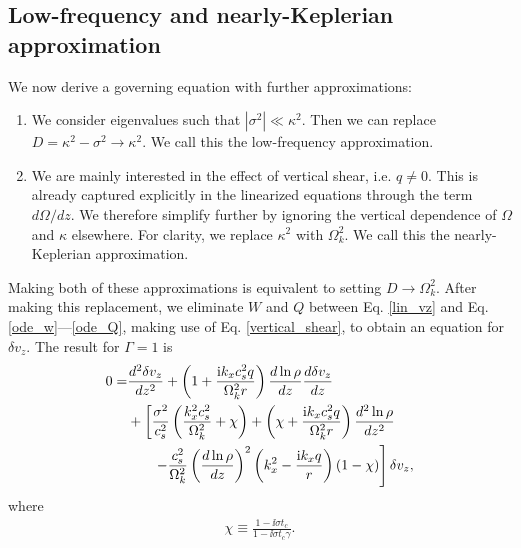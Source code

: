 \subsection{Low-frequency and nearly-Keplerian
  approximation}\label{approx_gov} 
We now derive a governing equation with further approximations:
\begin{enumerate}
\item We consider eigenvalues such that
  $|\sigma^2|\ll \kappa^2$. Then we can replace $D=\kappa^2 -\sigma^2\to
  \kappa^2$. %
  We call this the low-frequency approximation. 
\item We are mainly interested in the effect of vertical shear, i.e. $q\neq
  0$. This is already captured explicitly in the linearized equations through
  the term $d\Omega/dz$. We therefore simplify 
  further by ignoring the vertical dependence of $\Omega$ and $\kappa$
  elsewhere. For clarity, we replace $\kappa^2$ with
  $\Omega_k^2$. We call this the nearly-Keplerian approximation. 
  
\end{enumerate}
Making both of these approximations is equivalent to setting 
$D\to\Omega_k^2$.  After making this replacement, we eliminate $W$ and
$Q$ between  Eq. \ref{lin_vz} and Eq. \ref{ode_w}---\ref{ode_Q},
making use of Eq. \ref{vertical_shear}, to
obtain an equation for $\delta v_z$. The result for $\Gamma=1$ is
\begin{align}
  0 =& \frac{d^2\delta v_z}{dz^2} + \left(1 + \frac{\mathrm{i} k_x c_s^2
      q}{\Omega_k^2r}\right)\frac{d\ln\rho}{dz}\frac{d\delta
    v_z}{dz} \notag\\
  &+ \left[\frac{\sigma^2}{c_s^2}\left(\frac{k_x^2c_s^2}{\Omega_k^2} +
      \chi\right) + \left(\chi + \frac{\mathrm{i} k_x c_s^2
        q}{\Omega_k^2r}\right)\frac{d^2\ln\rho}{dz^2}\right. \notag\\
  &\phantom{+=}\left.-
    \frac{c_s^2}{\Omega_k^2}\left(\frac{d\ln\rho}{dz}\right)^2\left(k_x^2 -
      \frac{\mathrm{i} k_x q}{r}\right)
    \left(1-\chi\right) 
  \right]\delta v_z,\label{vertiso_gov}
\end{align}
where
\begin{align}
  \chi \equiv \frac{1-\ii\sigma t_c}{1-\ii\sigma t_c\gamma}.
\end{align}

